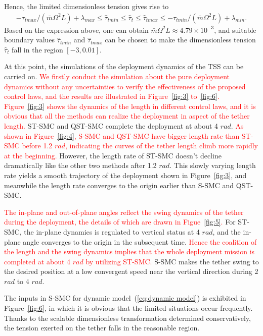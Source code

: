 \documentclass[3p]{elsarticle}
\theoremstyle{plain}
\theoremstyle{remark}
\begin{document}
Hence, the limited dimensionless tension gives rise to
\begin{align}
-\tau_{tmax}/(\bar{m}\Omega^2L)+\lambda_{max}\le\hat\tau_{tmin}\le\hat\tau_t\le\hat\tau_{tmax}\le-\tau_{tmin}/(\bar{m}\Omega^2L)+\lambda_{min}.
\end{align}
Based on the expression above, one can obtain $\bar{m}\Omega^2L\approx 4.79\times 10^{-3}$, and suitable boundary values $\hat\tau_{tmin}$ and $\hat\tau_{tmax}$ can be chosen to make the dimensionless tension $\hat\tau_t$ fall in the region $[-3,0.01]$.\par
At this point, the simulations of the deployment dynamics of the TSS can be carried on. \textcolor{red}{We firstly conduct the simulation about the pure deployment dynamics without any uncertainties to verify the effectiveness of the proposed control laws, and the results are illustrated in Figure~\ref{fig:3} to~\ref{fig:6}. Figure~\ref{fig:3} shows the dynamics of the length in different control laws, and it is obvious that all the methods can realize the deployment in aspect of the tether length.} ST-SMC and QST-SMC complete the deployment at about 4 $rad$. \textcolor{red}{As shown in Figure~\ref{fig:4}, S-SMC and QST-SMC have bigger length rate than ST-SMC before 1.2 $rad$, indicating the curves of the tether length climb more rapidly at the beginning.} However, the length rate of ST-SMC doesn't decline dramatically like the other two methods after 1.2 $rad$. This slowly varying length rate yields a smooth trajectory of the deployment shown in Figure~\ref{fig:3}, and meanwhile the length rate converges to the origin earlier than S-SMC and QST-SMC.\par
\textcolor{red}{The in-plane and out-of-plane angles reflect the swing dynamics of the tether during the deployment, the details of which are drawn in Figue~\ref{fig:5}.} For ST-SMC, the in-plane dynamics is regulated to vertical status at 4 $rad$, and the in-plane angle converges to the origin in the subsequent time. \textcolor{red}{Hence the coalition of the length and the swing dynamics implies that the whole deployment mission is completed at about 4 $rad$ by utilizing ST-SMC.} S-SMC makes the tether swing to the desired position at a low convergent speed near the vertical direction during 2 $rad$ to 4 $rad$.\par
The inputs in S-SMC for dynamic model~(\ref{eq:dynamic model}) is exhibited in Figure~\ref{fig:6}, in which it is obvious that the limited situations occur frequently. Thanks to the scalable dimensionless transformation determined conservatively, the tension exerted on the tether falls in the reasonable region.\par
\end{document}
